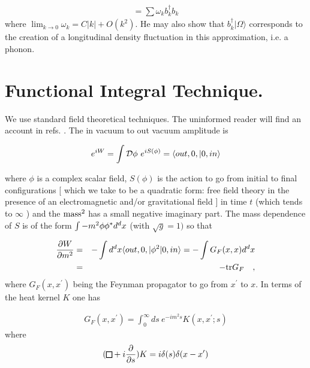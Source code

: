 \documentclass[12pt,oneside]{report}
\newcommand\Dalamb{\mathchoice\sqr68\sqr68\sqr{4.2}6\sqr{3}6}
\def\sqr#1#2{{\vcenter{\vbox{\hrule height.#2pt
          \hbox{\vrule width.#2pt height#1pt \kern#1pt
           \vrule width.#2pt}
           \hrule height.#2pt}}}}
\begin{document}
\begin{eqnarray}
[ H - \langle \Omega \vert H \vert \Omega \rangle ] = \sum \omega _k b_{k}
^{\dagger} b_k \label {A.6}
\end{eqnarray}
where $ \lim_{k\to 0}\omega _k = C \vert k \vert +
O(k^2)$. He may also show that $ b_{k} ^{\dagger} \vert 
\Omega \rangle$
corresponds to the creation of a longitudinal density fluctuation
in this approximation, i.e. a phonon.





\chapter{ 
Functional Integral Technique. }\label{functint}



We use standard field theoretical techniques. The uninformed
reader will find an account in refs. \cite{Schw}\cite{BD}\cite{PaBr0}.
The in	vacuum to out
vacuum amplitude is

\begin{eqnarray}
e^{iW} = \int {\cal D} \phi\  e^{i S (\phi)} = \langle out, 0, \vert 0, in\rangle 
\label {A.7} 
\end{eqnarray}

\noindent where $ \phi$ is a complex scalar field, $ S(\phi) $ is the
action to go from initial to final configurations [ which we take
to be a quadratic form: free field theory in the presence of an
electromagnetic and/or gravitational field ] in time $ t $ (which
tends to $ \infty $ ) and the $\rm mass^2 $ has a
small negative imaginary part. The mass dependence of $ S $ is of
the form $ \int -m^2 \phi \phi^*\/d^d x $ (with $ \sqrt g = 1) $ so that

\begin{eqnarray}
{\partial W \over \partial m^2}& =& -
 \int d^d x \langle out, 0, \vert 
 \phi^2 \vert0, in\rangle  = - \int G_F (x, x) d^d x \nonumber\\
& = & - {\rm tr} G_F \quad ,\label {A.8}
\end{eqnarray}
where $ G_F (x, x^{\prime}) $ being the Feynman propagator to go from $
x^{\prime}$ to $ x $. In terms of the heat kernel $K$ one has

\begin{eqnarray}
G_F (x, x^{\prime}) = \int_{0} ^{\infty} \!ds\  e^{- i m^2 s} K(x,
x^{\prime}; s) \label {F.9}
\end{eqnarray}
where
\begin{eqnarray}
(\Dalamb + i {\partial \over \partial s}) K = i \delta
(s)\delta(x-x^{\prime}) \label {F.10} 
\end{eqnarray}
\end{document}
